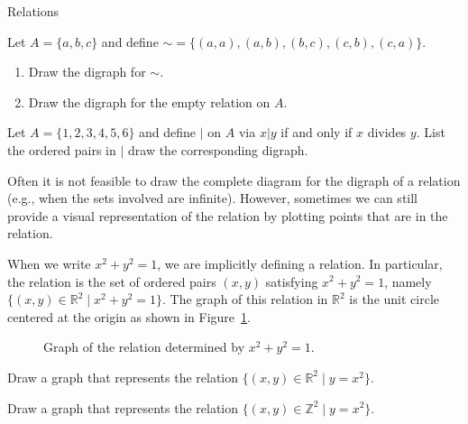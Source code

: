 \begin{section}{Relations}
\begin{problem}
Let $A=\{a,b,c\}$ and define ${\sim}=\{(a,a),(a,b),(b,c),(c,b),(c,a)\}$.  
\begin{enumerate}[label=\textrm{(\alph*)}]
\item Draw the digraph for $\sim$.
\item Draw the digraph for the empty relation on $A$.
\end{enumerate}
\end{problem}

\begin{problem}
Let $A=\{1,2,3,4,5,6\}$ and define $|$ on $A$ via $x|y$ if and only if $x$ divides $y$.  List the ordered pairs in $|$ draw the corresponding digraph.
\end{problem}

Often it is not feasible to draw the complete diagram for the digraph of a relation (e.g., when the sets involved are infinite).  However, sometimes we can still provide a visual representation of the relation by plotting points that are in the relation.

\begin{example}
When we write $x^2+y^2=1$, we are implicitly defining a relation.  In particular, the relation is the set of ordered pairs $(x,y)$ satisfying $x^2+y^2=1$, namely $\{(x,y)\in \mathbb{R}^2 \mid x^2+y^2=1\}$. The graph of this relation in $\mathbb{R}^2$ is the unit circle centered at the origin as shown in Figure~\ref{fig:unit circle}.
\end{example}

\begin{figure}[h!]
\centering
{}
\caption{Graph of the relation determined by $x^2+y^2=1$.}\label{fig:unit circle}
\end{figure}

\begin{problem}
Draw a graph that represents the relation $\{(x,y)\in \mathbb{R}^2 \mid y=x^2\}$.
\end{problem}

\begin{problem}
Draw a graph that represents the relation $\{(x,y)\in \mathbb{Z}^2 \mid y=x^2\}$.
\end{problem}


\end{section}

